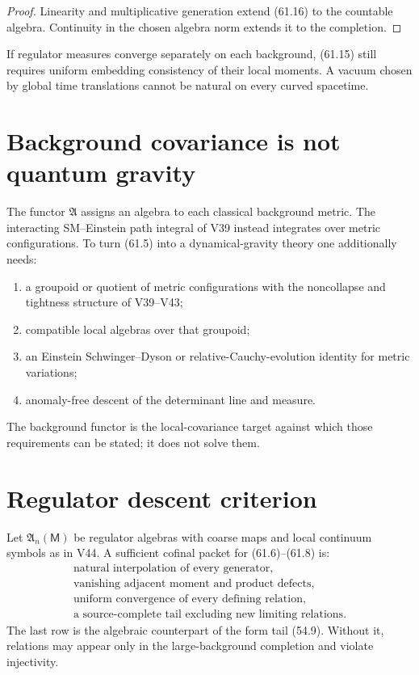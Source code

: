 \documentclass[11pt]{article}
\theoremstyle{remark}
\begin{document}
\begin{proof}
Linearity and multiplicative generation extend (61.16) to the
countable algebra.  Continuity in the chosen algebra norm extends it
to the completion.
\end{proof}

If regulator measures converge separately on each background,
(61.15) still requires uniform embedding consistency of their local
moments.  A vacuum chosen by global time translations cannot be
natural on every curved spacetime.

\section{Background covariance is not quantum gravity}

The functor \({\mathfrak A}\) assigns an algebra to each classical
background metric.  The interacting SM--Einstein path integral of
V39 instead integrates over metric configurations.  To turn (61.5)
into a dynamical-gravity theory one additionally needs:
\begin{enumerate}
\item a groupoid or quotient of metric configurations with the
      noncollapse and tightness structure of V39--V43;
\item compatible local algebras over that groupoid;
\item an Einstein Schwinger--Dyson or relative-Cauchy-evolution
      identity for metric variations;
\item anomaly-free descent of the determinant line and measure.
\end{enumerate}
The background functor is the local-covariance target against which
those requirements can be stated; it does not solve them.

\section{Regulator descent criterion}

Let \({\mathfrak A}_n({\mathsf M})\) be regulator algebras with
coarse maps and local continuum symbols as in V44.  A sufficient
cofinal packet for (61.6)--(61.8) is:
\[
\begin{gathered}
\text{natural interpolation of every generator},\\
\text{vanishing adjacent moment and product defects},\\
\text{uniform convergence of every defining relation},\\
\text{a source-complete tail excluding new limiting relations}.
                                                               \tag{61.17}
\end{gathered}
\]
The last row is the algebraic counterpart of the form tail (54.9).
Without it, relations may appear only in the large-background
completion and violate injectivity.
\end{document}
